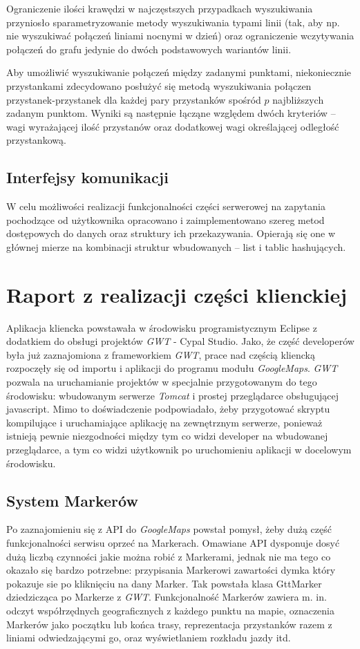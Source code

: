 \documentclass[a4paper,12pt]{article}
\begin{document}
  Ograniczenie ilości krawędzi w najczęstszych przypadkach wyszukiwania
  przyniosło sparametryzowanie metody wyszukiwania typami linii (tak, aby np.
  nie wyszukiwać połączeń liniami nocnymi w dzień) oraz ograniczenie
  wczytywania połączeń do grafu jedynie do dwóch podstawowych wariantów linii.
  
  Aby umożliwić wyszukiwanie połączeń między zadanymi punktami, niekoniecznie
  przystankami zdecydowano posłużyć się metodą wyszukiwania połączen
  przystanek-przystanek dla każdej pary przystanków spośród $p$ najbliższych
  zadanym punktom. Wyniki są następnie łącząne względem dwóch kryteriów -- wagi
  wyrażającej ilość przystanów oraz dodatkowej wagi określającej odległość
  przystankową.
  
  \subsection{Interfejsy komunikacji}
  W celu możliwości realizacji funkcjonalności części serwerowej na zapytania
  pochodzące od użytkownika opracowano i zaimplementowano szereg metod
  dostępowych do danych oraz struktury ich przekazywania. Opierają się one w
  głównej mierze na kombinacji struktur wbudowanych -- list i tablic
  hashujących. 

\section{Raport z realizacji części klienckiej}
Aplikacja kliencka powstawała w środowisku programistycznym Eclipse z dodatkiem
do obsługi projektów \emph{GWT} - Cypal Studio. Jako, że część developerów była
już zaznajomiona z frameworkiem \emph{GWT}, prace nad częścią kliencką rozpoczęły
się od importu i aplikacji do programu modułu \emph{GoogleMaps}. \emph{GWT} pozwala
na uruchamianie projektów w specjalnie przygotowanym do tego środowisku: wbudowanym
serwerze \emph{Tomcat} i prostej przeglądarce obsługującej javascript. Mimo to
doświadczenie podpowiadało, żeby przygotować skryptu kompilujące i uruchamiające
aplikację na zewnętrznym serwerze, ponieważ istnieją pewnie niezgodności między tym
co widzi developer na wbudowanej przeglądarce, a tym co widzi użytkownik po
uruchomieniu aplikacji w docelowym środowisku.

\subsection{System Markerów}
Po zaznajomieniu się z API do \emph{GoogleMaps} powstał pomysł, żeby dużą część
funkcjonalności serwisu oprzeć na Markerach. Omawiane API dysponuje dosyć dużą
liczbą czynności jakie można robić z Markerami, jednak nie ma tego co okazało się
bardzo potrzebne: przypisania Markerowi zawartości dymka który pokazuje sie po
kliknięciu na dany Marker. Tak powstała klasa GttMarker dziedzicząca po Markerze
z \emph{GWT}. Funkcjonalność Markerów zawiera m. in. odczyt współrzędnych
geograficznych z każdego punktu na mapie, oznaczenia Markerów jako początku lub
końca trasy, reprezentacja przystanków razem z liniami odwiedzającymi go, oraz
wyświetlaniem rozkładu jazdy itd.
\end{document}

